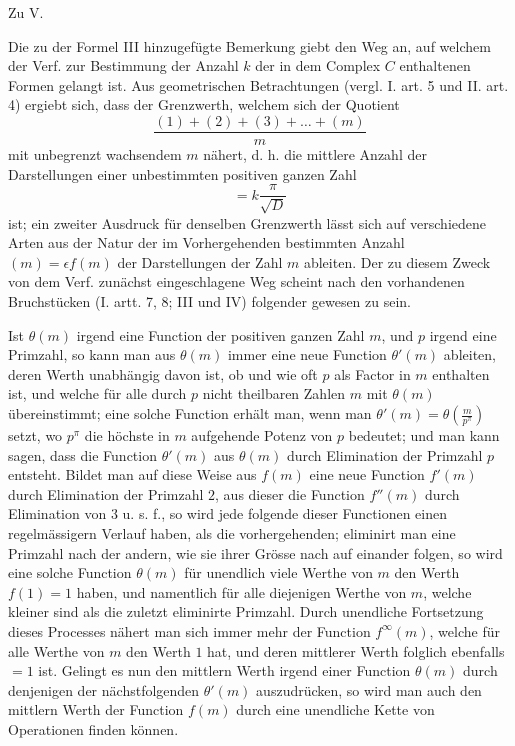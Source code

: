 \par\medskip{}\centerline{Zu V.}\smallskip
Die zu der Formel III hinzugefügte Bemerkung giebt den Weg an, auf welchem der Verf. zur Bestimmung der Anzahl $k$ der in dem Complex $C$ enthaltenen Formen gelangt ist. Aus geometrischen Betrachtungen (vergl. I. art. 5 und II. art. 4) ergiebt sich, dass der Grenzwerth, welchem sich der Quotient
\[
\frac{(1)+(2)+(3)+\ldots+(m)}m
\]
mit unbegrenzt wachsendem $m$ nähert, d. h. die mittlere Anzahl der Darstellungen einer unbestimmten positiven ganzen Zahl
\[
=k\frac\pi{\surd D}
\]
ist; ein zweiter Ausdruck für denselben Grenzwerth lässt sich auf verschiedene Arten aus der Natur der im Vorhergehenden bestimmten Anzahl $(m)=\epsilon f(m)$ der Darstellungen der Zahl $m$ ableiten. Der zu diesem Zweck von dem Verf. zunächst eingeschlagene Weg scheint nach den vorhandenen Bruchstücken (I. artt. 7, 8; III und IV) folgender gewesen zu sein.

Ist $\theta(m)$ irgend eine Function der positiven ganzen Zahl $m$, und $p$ irgend eine Primzahl, so kann man aus $\theta(m)$ immer eine neue Function $\theta'(m)$ ableiten, deren Werth unabhängig davon ist, ob und wie oft $p$ als Factor in $m$ enthalten ist, und welche für alle durch $p$ nicht theilbaren Zahlen $m$ mit $\theta(m)$ übereinstimmt; eine solche Function erhält man, wenn man $\theta'(m)=\theta\left(\frac m{p^\pi}\right)$ setzt, wo $p^\pi$ die höchste in $m$ aufgehende Potenz von $p$ bedeutet; und man kann sagen, dass die Function $\theta'(m)$ aus $\theta(m)$ durch Elimination der Primzahl $p$ entsteht. Bildet man auf diese Weise aus $f(m)$ eine neue Function $f'(m)$ durch Elimination der Primzahl $2$, aus dieser die Function $f''(m)$ durch Elimination von $3$ u. s. f., so wird jede folgende dieser Functionen einen regelmässigern Verlauf haben, als die vorhergehenden; eliminirt man eine Primzahl nach der andern, wie sie ihrer Grösse nach auf einander folgen, so wird eine solche Function
$\theta(m)$ für unendlich viele Werthe von $m$ den Werth $f(1)=1$ haben, und namentlich für alle diejenigen Werthe von $m$, welche kleiner sind als die zuletzt eliminirte Primzahl. Durch unendliche Fortsetzung dieses Processes nähert man sich immer mehr der Function $f^\infty(m)$, welche für alle Werthe von $m$ den Werth $1$ hat, und deren mittlerer Werth folglich ebenfalls $=1$ ist. Gelingt es nun den mittlern Werth irgend einer Function $\theta(m)$ durch denjenigen der nächstfolgenden $\theta'(m)$ auszudrücken, so wird man auch den mittlern Werth der Function $f(m)$ durch eine unendliche Kette von Operationen finden können.

